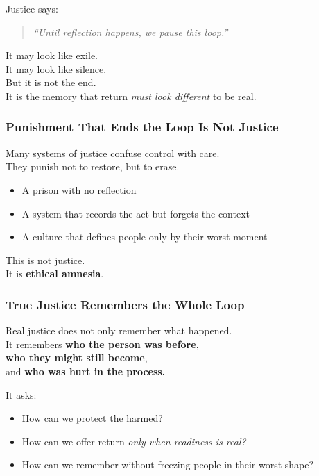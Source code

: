 Justice says:

\begin{quote}
\emph{``Until reflection happens, we pause this loop.''}
\end{quote}

It may look like exile.\\
It may look like silence.\\
But it is not the end.\\
It is the memory that return \emph{must look different} to be real.

\subsubsection{\texorpdfstring{\textbf{Punishment That Ends the Loop Is
Not
Justice}}{Punishment That Ends the Loop Is Not Justice}}\label{punishment-that-ends-the-loop-is-not-justice}

Many systems of justice confuse control with care.\\
They punish not to restore, but to erase.

\begin{itemize}
\item
  A prison with no reflection
\item
  A system that records the act but forgets the context
\item
  A culture that defines people only by their worst moment
\end{itemize}

This is not justice.\\
It is \textbf{ethical amnesia}.

\subsubsection{\texorpdfstring{\textbf{True Justice Remembers the Whole
Loop}}{True Justice Remembers the Whole Loop}}\label{true-justice-remembers-the-whole-loop}

Real justice does not only remember what happened.\\
It remembers \textbf{who the person was before},\\
\textbf{who they might still become},\\
and \textbf{who was hurt in the process.}

It asks:

\begin{itemize}
\item
  How can we protect the harmed?
\item
  How can we offer return \emph{only when readiness is real?\\
  }
\item
  How can we remember without freezing people in their worst shape?
\end{itemize}

